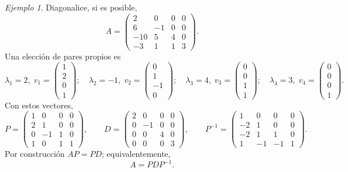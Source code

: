 \documentclass[12pt]{article}
\theoremstyle{remark}
\newtheorem{Ejem}[definicion]{Ejemplo}
\begin{document}
\begin{Ejem}


Diagonalice, si es posible,
\[
A=\begin{pmatrix}2 & 0 & 0 & 0\\6 & -1 & 0 & 0\\-10 & 5 & 4 & 0\\-3 & 1 & 1 & 3\end{pmatrix}.
\]
\scriptsize
Una elección de pares propios es
\[
\lambda_1=2,\;v_1=\begin{pmatrix}1\\2\\0\\1\end{pmatrix};\quad \lambda_2=-1,\;v_2=\begin{pmatrix}0\\1\\-1\\0\end{pmatrix};\quad \lambda_3=4,\;v_3=\begin{pmatrix}0\\0\\1\\1\end{pmatrix};\quad \lambda_4=3,\;v_4=\begin{pmatrix}0\\0\\0\\1\end{pmatrix}.
\]
Con estos vectores,
\[
P=\begin{pmatrix}1 & 0 & 0 & 0\\2 & 1 & 0 & 0\\0 & -1 & 1 & 0\\1 & 0 & 1 & 1\end{pmatrix},\qquad D=\begin{pmatrix}2 & 0 & 0 & 0\\0 & -1 & 0 & 0\\0 & 0 & 4 & 0\\0 & 0 & 0 & 3\end{pmatrix},\qquad P^{-1}=\begin{pmatrix}1 & 0 & 0 & 0\\-2 & 1 & 0 & 0\\-2 & 1 & 1 & 0\\1 & -1 & -1 & 1\end{pmatrix}.
\]
Por construcción $AP=PD$; equivalentemente,
\[
\boxed{A=PDP^{-1}}.
\]
\end{Ejem}
\end{document}

